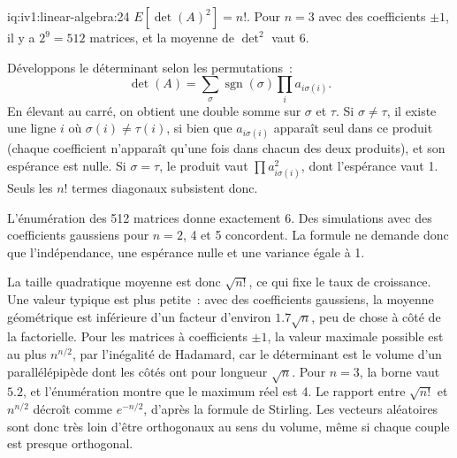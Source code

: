 \begin{solution}{iq:iv1:linear-algebra:24}
$E[\det(A)^2] = n!$. Pour $n = 3$ avec des coefficients $\pm 1$, il y a $2^9 = 512$ matrices, et la moyenne de $\det^2$ vaut 6.

Développons le déterminant selon les permutations~:
\[
\det(A) = \sum_\sigma \operatorname{sgn}(\sigma)\prod_i a_{i\sigma(i)}.
\]
En élevant au carré, on obtient une double somme sur $\sigma$ et $\tau$. Si $\sigma \ne \tau$, il existe une ligne $i$ où $\sigma(i) \ne \tau(i)$, si bien que $a_{i\sigma(i)}$ apparaît seul dans ce produit (chaque coefficient n'apparaît qu'une fois dans chacun des deux produits), et son espérance est nulle. Si $\sigma = \tau$, le produit vaut $\prod a_{i\sigma(i)}^2$, dont l'espérance vaut 1. Seuls les $n!$ termes diagonaux subsistent donc.

L'énumération des 512 matrices donne exactement 6. Des simulations avec des coefficients gaussiens pour $n = 2$, 4 et 5 concordent. La formule ne demande donc que l'indépendance, une espérance nulle et une variance égale à 1.

La taille quadratique moyenne est donc $\sqrt{n!}$, ce qui fixe le taux de croissance. Une valeur typique est plus petite~: avec des coefficients gaussiens, la moyenne géométrique est inférieure d'un facteur d'environ $1.7\sqrt{n}$, peu de chose à côté de la factorielle. Pour les matrices à coefficients $\pm 1$, la valeur maximale possible est au plus $n^{n/2}$, par l'inégalité de Hadamard, car le déterminant est le volume d'un parallélépipède dont les côtés ont pour longueur $\sqrt{n}$. Pour $n = 3$, la borne vaut $5.2$, et l'énumération montre que le maximum réel est 4. Le rapport entre $\sqrt{n!}$ et $n^{n/2}$ décroît comme $e^{-n/2}$, d'après la formule de Stirling. Les vecteurs aléatoires sont donc très loin d'être orthogonaux au sens du volume, même si chaque couple est presque orthogonal.

\end{solution}

